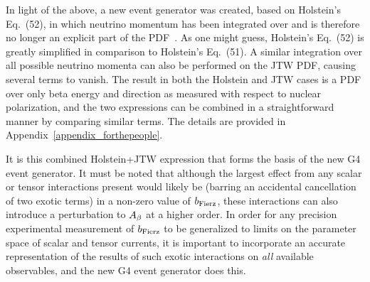
In light of the above, a new event generator was created, based on Holstein's Eq.~(52), in which neutrino momentum has been integrated over and is therefore no longer an explicit part of the PDF~\cite{holstein}.  As one might guess, Holstein's Eq.~(52) is greatly simplified in comparison to Holstein's Eq.~(51).  A similar integration over all possible neutrino momenta can also be performed on the JTW PDF, causing several terms to vanish.  The result in both the Holstein and JTW cases is a PDF over only beta energy and direction as measured with respect to nuclear polarization, and the two expressions can be combined in a straightforward manner by comparing similar terms.  The details are provided in Appendix~\ref{appendix_forthepeople}.

It is this combined Holstein+JTW expression that forms the basis of the new G4 event generator.  It must be noted that although the largest effect from any scalar or tensor interactions present would likely be (barring an accidental cancellation of two exotic terms) in a non-zero value of $b_{\mathrm{Fierz}}$, these interactions can also introduce a perturbation to $A_{\beta}$ at a higher order.  In order for any precision experimental measurement of $b_{\mathrm{Fierz}}$ to be generalized to limits on the parameter space of scalar and tensor currents, it is important to incorporate an accurate representation of the results of such exotic interactions on \emph{all} available observables, and the new G4 event generator does this.  


